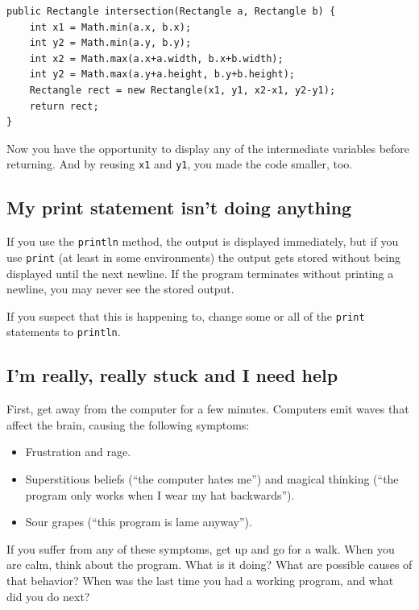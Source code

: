 \documentclass[12pt]{book}
\theoremstyle{exercise}
\begin{document}
\begin{lstlisting}
public Rectangle intersection(Rectangle a, Rectangle b) {
    int x1 = Math.min(a.x, b.x);
    int y2 = Math.min(a.y, b.y);
    int x2 = Math.max(a.x+a.width, b.x+b.width);
    int y2 = Math.max(a.y+a.height, b.y+b.height);
    Rectangle rect = new Rectangle(x1, y1, x2-x1, y2-y1);
    return rect;
}
\end{lstlisting}
%
Now you have the opportunity to display any of
the intermediate variables before returning.  And by
reusing {\tt x1} and {\tt y1}, you made the code smaller, too.


\subsection*{My print statement isn't doing anything}

If you use the {\tt println} method, the output is displayed
immediately, but if you use {\tt print} (at least in some
environments) the output gets stored without being displayed until the
next newline.  If the program terminates without
printing a newline, you may never see the stored output.

If you suspect that this is happening to, change
some or all of the {\tt print} statements to {\tt println}.


\subsection*{I'm really, really stuck and I need help}

First, get away from the computer for a few minutes.
Computers emit waves that affect the brain, causing the following
symptoms:

\begin{itemize}

\item Frustration and rage.

\item Superstitious beliefs (``the computer hates me'') and
magical thinking (``the program only works when I wear my
hat backwards'').

\item Sour grapes (``this program is lame anyway'').

\end{itemize}

If you suffer from any of these symptoms, get
up and go for a walk.  When you are calm, think about the program.
What is it doing?  What are possible causes of that
behavior?  When was the last time you had a working program,
and what did you do next?
\end{document}
